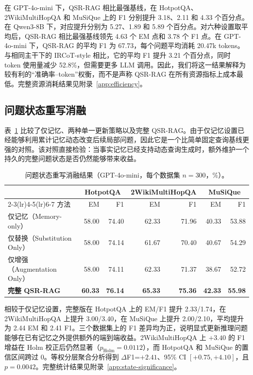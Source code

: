 \documentclass[11pt]{article}
\begin{document}
	在 GPT-4o-mini 下，QSR-RAG 相比最强基线，在 HotpotQA、2WikiMultiHopQA 和 MuSiQue 上的 F1 分别提升 3.18、2.11 和 4.33 个百分点。在 Qwen3-8B 下，对应提升分别为 5.27、1.89 和 5.89 个百分点。对六种设置取平均后，QSR-RAG 相比最强基线领先 4.63 个 EM 点和 3.78 个 F1 点。在 GPT-4o-mini 下，QSR-RAG 的平均 F1 为 67.73，每个问题平均消耗 20.47k tokens。与相同主干下的 IRCoT-style 相比，它的平均 F1 提升 3.21 个百分点，同时 token 使用量减少 52.8\%，但需要更多 LLM 调用。因此，我们将这一结果解释为较有利的“准确率--token”权衡，而不是声称 QSR-RAG 在所有资源指标上成本最低。完整资源消耗结果见附录~\ref{app:efficiency}。

	\subsection{问题状态重写消融}
	表~\ref{tab:ablation} 比较了仅记忆、两种单一更新策略以及完整 QSR-RAG。由于仅记忆设置已经能够利用累计记忆动态改变后续局部问题，因此它是一个比简单固定查询基线更强的对照。该对照直接检验：当事实记忆已经支持动态查询生成时，额外维护一个持久的完整问题状态是否仍然能够带来收益。

	\begin{table}[t]
		\centering
		\caption{问题状态重写消融结果（GPT-4o-mini，每个数据集 $n=300$，\%）。}
		\label{tab:ablation}
		\small
		\setlength{\tabcolsep}{5pt}
		\begin{tabular}{lrrrrrr}
			\toprule
			& \multicolumn{2}{c}{HotpotQA} & \multicolumn{2}{c}{2WikiMultiHopQA} & \multicolumn{2}{c}{MuSiQue}\\
			\cmidrule(lr){2-3}\cmidrule(lr){4-5}\cmidrule(lr){6-7}
			方法 & EM & F1 & EM & F1 & EM & F1\\
			\midrule
			仅记忆（Memory-only）       & 58.00 & 74.40 & 62.33 & 71.96 & 40.33 & 53.88\\
			仅替换（Substitution Only） & 58.00 & 74.14 & 61.67 & 70.40 & 40.67 & 54.29\\
			仅增强（Augmentation Only） & 58.00 & 74.11 & 62.33 & 71.37 & 38.67 & 52.72\\
			\textbf{完整 QSR-RAG} & \textbf{60.33} & \textbf{76.14} & \textbf{65.33} & \textbf{75.36} & \textbf{42.33} & \textbf{55.98}\\
			\bottomrule
		\end{tabular}
	\end{table}

	相较于仅记忆设置，完整版在 HotpotQA 上的 EM/F1 提升 2.33/1.74，在 2WikiMultiHopQA 上提升 3.00/3.40，在 MuSiQue 上提升 2.00/2.10，平均提升为 2.44 EM 和 2.41 F1。三个数据集上的 F1 差异均为正，说明显式更新推理问题能够在已有记忆之外提供额外的端到端收益。2WikiMultiHopQA 上 $+3.40$ 的 F1 增益在 Holm 校正后仍然显著（$p_{\mathrm{Holm}}=0.0112$），而 HotpotQA 和 MuSiQue 的置信区间跨过 0。等权分层聚合分析得到 $\Delta$F1=$+2.41$、95\% CI $[+0.75,+4.10]$，且 $p=0.0042$。完整统计结果见附录~\ref{app:state-significance}。
\end{document}
